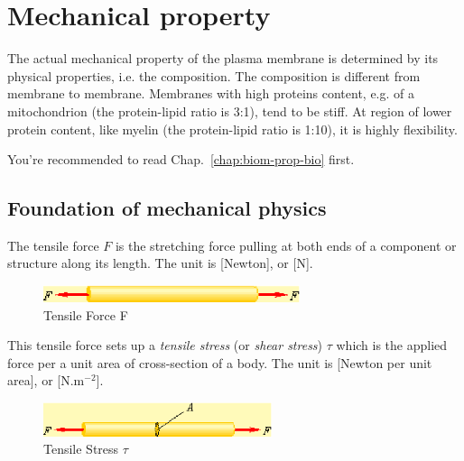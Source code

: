 




\section{Mechanical property}
\label{sec:mechanical-property-1}

The actual mechanical property of the plasma membrane is determined by
its physical properties, i.e. the composition. The composition is
different from membrane to membrane. Membranes with high proteins
content, e.g. of a mitochondrion (the protein-lipid ratio is 3:1),
tend to be stiff.  At region of lower protein content, like myelin
(the protein-lipid ratio is 1:10), it is highly flexibility.

You're recommended to read Chap.~\ref{chap:biom-prop-bio} first. 

\subsection{Foundation of mechanical physics}
\label{sec:found-mech-phys}

The tensile force $F$ is the stretching force pulling at both ends of
a component or structure along its length. The unit is [Newton], or
[N].
  \begin{figure}[htb]
    \centerline{\includegraphics[height=0.5cm]{./images/tensileForce.eps}}
    \caption{Tensile Force F}\label{fig:tensileForce}
  \end{figure}

  This tensile force sets up a {\it tensile stress} (or
  {\it shear stress}) $\tau$ which is the applied force per a unit area of
  cross-section of a body. The unit is [Newton per unit area], or
  [N.m$^{-2}$].
  \begin{figure}[htb]
    \centerline{\includegraphics[height=1cm]{./images/tensileStress.eps}}
    \caption{Tensile Stress $\tau$}\label{fig:tensileStress}
  \end{figure}

